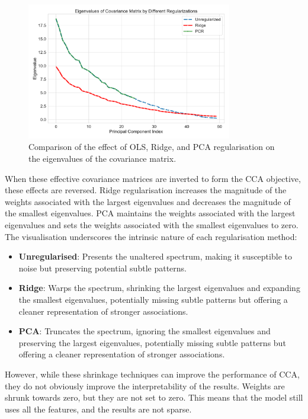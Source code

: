 \begin{figure}[h]
    \centering
    \includegraphics[width=0.8\textwidth]{figures/shrinkage/shrinkage}
    \caption{Comparison of the effect of OLS, Ridge, and PCA regularisation on the eigenvalues of the covariance matrix.}\label{fig:shrinkage}
\end{figure}

When these effective covariance matrices are inverted to form the CCA objective, these effects are reversed.
Ridge regularisation increases the magnitude of the weights associated with the largest eigenvalues and decreases the magnitude of the smallest eigenvalues.
PCA maintains the weights associated with the largest eigenvalues and sets the weights associated with the smallest eigenvalues to zero.
The visualisation underscores the intrinsic nature of each regularisation method:
\begin{itemize}
    \item \textbf{Unregularised}: Presents the unaltered spectrum, making it susceptible to noise but preserving potential subtle patterns.
    \item \textbf{Ridge}: Warps the spectrum, shrinking the largest eigenvalues and expanding the smallest eigenvalues, potentially missing subtle patterns but offering a cleaner representation of stronger associations.
    \item \textbf{PCA}: Truncates the spectrum, ignoring the smallest eigenvalues and preserving the largest eigenvalues, potentially missing subtle patterns but offering a cleaner representation of stronger associations.
\end{itemize}

However, while these shrinkage techniques can improve the performance of CCA, they do not obviously improve the interpretability of the results.
Weights are shrunk towards zero, but they are not set to zero.
This means that the model still uses all the features, and the results are not sparse.

